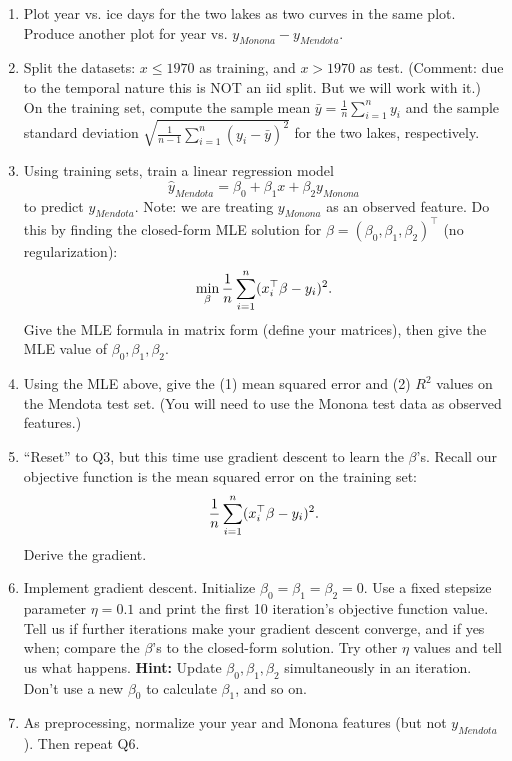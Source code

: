 \documentclass[a4paper]{article}
\theoremstyle{definition}
\begin{document}
\begin{enumerate}
\item
Plot year vs. ice days for the two lakes as two curves in the same plot.
Produce another plot for year vs. $y_{Monona} - y_{Mendota}$.


\item
Split the datasets: $x\le 1970$ as training, and $x>1970$ as test.
(Comment: due to the temporal nature this is NOT an iid split.  But we will work with it.)
On the training set, compute the sample mean $\bar y=\frac{1}{n}\sum_{i=1}^n y_i$ and the sample standard deviation $\sqrt{\frac{1}{n-1}\sum_{i=1}^n (y_i-\bar y)^2}$ for the two lakes, respectively.

\item
Using training sets, train a linear regression model
$$\hat y_{Mendota} = \beta_0 + \beta_1 x + \beta_2 y_{Monona}$$
to predict $y_{Mendota}$.
Note: we are treating $y_{Monona}$ as an observed feature.
Do this by finding the closed-form MLE solution for $\beta=(\beta_0, \beta_1, \beta_2)^\top$ (no regularization):
$$\min_\beta {1\over n} \sum_{i=1}^n (x_i^\top \beta - y_i)^2.$$
Give the MLE formula in matrix form (define your matrices), then give the MLE value of $\beta_0, \beta_1, \beta_2$. 

\item
Using the MLE above, give the (1) mean squared error and (2) $R^2$ values on the Mendota test set.
(You will need to use the Monona test data as observed features.)


\item
``Reset'' to Q3, but this time use gradient descent to learn the $\beta$'s.
Recall our objective function is the mean squared error on the training set:
$${1\over n} \sum_{i=1}^n (x_i^\top \beta - y_i)^2.$$
Derive the gradient.

\item
Implement gradient descent.  Initialize $\beta_0= \beta_1= \beta_2=0$.  Use a fixed stepsize parameter $\eta=0.1$ and print the first 10 iteration's objective function value.
Tell us if further iterations make your gradient descent converge, and if yes when; compare the $\beta$'s to the closed-form solution.
Try other $\eta$ values and tell us what happens.
\textbf{Hint:} Update $\beta_0, \beta_1, \beta_2$ simultaneously in an iteration.  Don't use a new $\beta_0$ to calculate $\beta_1$, and so on.

\item
As preprocessing, normalize your year and Monona features (but not $y_{Mendota}$).
Then repeat Q6.


\end{enumerate}
\end{document}
